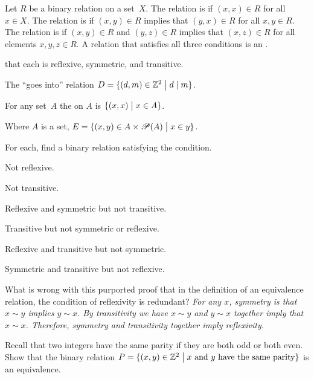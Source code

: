 \documentclass{ibl}
\begin{document}
\begin{df} 
Let $R$ be a binary relation on a set~$X$.
The relation is  if $(x,x)\in R$ for all $x\in X$.
The relation is  if $(x,y)\in R$ implies that
$(y,x)\in R$ for all $x,y\in R$.
The relation is  if 
$(x,y)\in R$ and $(y,z)\in R$ implies that 
$(x,z)\in R$ for all elements $x,y,z\in R$.
A relation that satisfies all three conditions is an
.  
\end{df}

\begin{ex}   \pord{} that each is reflexive, symmetric, and transitive.
\begin{exes}
\item The ``goes into'' relation
  $D=\{(d,m)\in\mathbb{Z}^2 \bigm| d\mid m\}$.
\item
  For any set~$A$ the  on $A$ 
  is $\{(x,x) \bigm| x\in A\}$. 
\item
  Where $A$ is a set,
  $E=\{(x,y)\in A\times\mathscr{P}(A) \bigm| x\in y\}$.
\end{exes}
\end{ex}

\begin{ex} For each, find a binary relation satisfying the condition.
\begin{exes}
\item Not reflexive.
\item Not transitive.
\item Reflexive and symmetric but not transitive.
\item Transitive but not symmetric or reflexive.
\item Reflexive and transitive but not symmetric.
\item Symmetric and transitive but not reflexive. 
\end{exes}
\end{ex}

\begin{ex}
What is wrong with this purported proof that in the definition
of an equivalence relation, the condition of reflexivity is redundant?
\textit{For any $x$, symmetry is that $x∼y$ implies $y∼x$.
By transitivity we have $x∼y$ and $y∼x$ together imply that $x∼x$. 
Therefore, symmetry and transitivity together imply reflexivity.}  
\end{ex}

\begin{ex}
Recall that two integers have the same parity if they are both odd or 
both even.
Show that the binary relation 
$P=\{(x,y)\in\mathbb{Z}^2 \bigm| \text{$x$ and $y$ have the same parity}\}$  
is an equivalence.
\end{ex}
\end{document}
